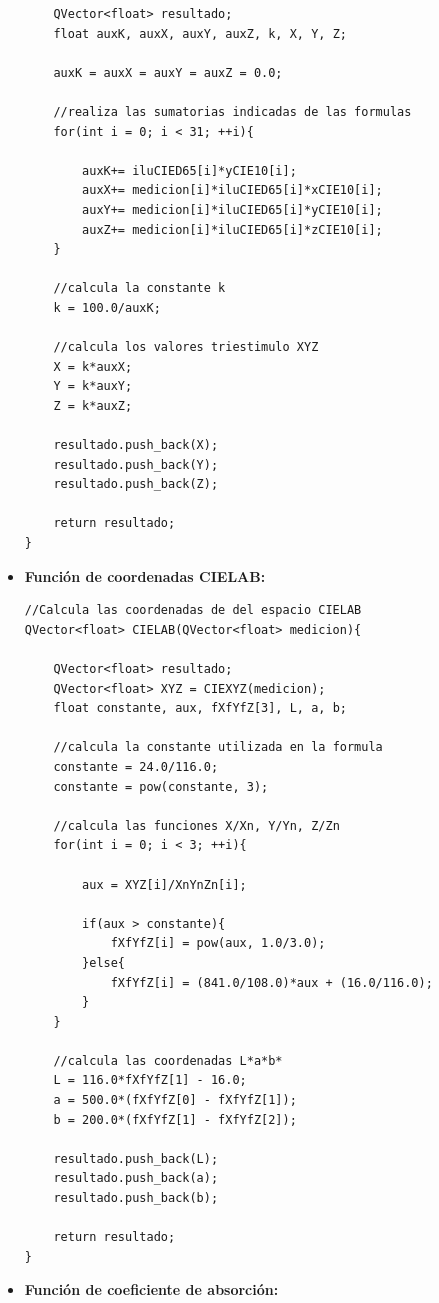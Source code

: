 \begin{itemize}
\begin{lstlisting}
    QVector<float> resultado;
    float auxK, auxX, auxY, auxZ, k, X, Y, Z;

    auxK = auxX = auxY = auxZ = 0.0;

    //realiza las sumatorias indicadas de las formulas
    for(int i = 0; i < 31; ++i){

		auxK+= iluCIED65[i]*yCIE10[i];
        auxX+= medicion[i]*iluCIED65[i]*xCIE10[i];
        auxY+= medicion[i]*iluCIED65[i]*yCIE10[i];
        auxZ+= medicion[i]*iluCIED65[i]*zCIE10[i];
    }

    //calcula la constante k
    k = 100.0/auxK;

    //calcula los valores triestimulo XYZ
    X = k*auxX;
    Y = k*auxY;
    Z = k*auxZ;

    resultado.push_back(X);
    resultado.push_back(Y);
    resultado.push_back(Z);

    return resultado;
}
			\end{lstlisting}

\newpage
		
		\item \textbf{Funci\'{o}n de coordenadas CIELAB:}
			\begin{lstlisting}
//Calcula las coordenadas de del espacio CIELAB
QVector<float> CIELAB(QVector<float> medicion){
    
    QVector<float> resultado;
    QVector<float> XYZ = CIEXYZ(medicion);
    float constante, aux, fXfYfZ[3], L, a, b;

    //calcula la constante utilizada en la formula
    constante = 24.0/116.0;
    constante = pow(constante, 3);

    //calcula las funciones X/Xn, Y/Yn, Z/Zn
    for(int i = 0; i < 3; ++i){

        aux = XYZ[i]/XnYnZn[i];

        if(aux > constante){
            fXfYfZ[i] = pow(aux, 1.0/3.0);
        }else{
            fXfYfZ[i] = (841.0/108.0)*aux + (16.0/116.0);
        }
    }

    //calcula las coordenadas L*a*b*
    L = 116.0*fXfYfZ[1] - 16.0;
    a = 500.0*(fXfYfZ[0] - fXfYfZ[1]);
    b = 200.0*(fXfYfZ[1] - fXfYfZ[2]);

    resultado.push_back(L);
    resultado.push_back(a);
    resultado.push_back(b);

    return resultado;
}
			\end{lstlisting}

\newpage		
		
		\item \textbf{Funci\'{o}n de coeficiente de absorci\'{o}n:}
		

\end{itemize}
